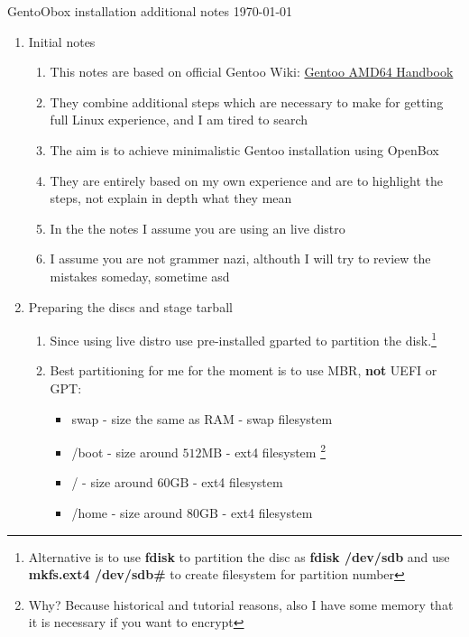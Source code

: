 \documentclass[10pt,a4paper]{article}
\begin{document}
	\pagestyle{fancy}
	\begin{center} GentoObox installation additional notes \today \end{center}

	\begin{enumerate}
		
		\item Initial notes \begin{enumerate}[label*=\arabic*.]

			\item This notes are based on official Gentoo Wiki: \href{https://wiki.gentoo.org/wiki/Handbook:AMD64}{Gentoo AMD64 Handbook} \\ 
			\item They combine additional steps which are necessary to make for getting full Linux experience, and I am tired to search
			\item The aim is to achieve minimalistic Gentoo installation using OpenBox
			\item They are entirely based on my own experience and are to highlight the steps, not explain in depth what they mean 
			\item In the the notes I assume you are using an live distro
			\item I assume you are not grammer nazi, althouth I will try to review the mistakes someday, sometime asd 

		\end{enumerate}
		
		\newpage
		
		\item Preparing the discs and stage tarball \begin{enumerate}[label*=\arabic*.]
			
			\item Since using live distro use pre-installed gparted to partition the disk.\footnote{ Alternative is to use \textbf{fdisk} to partition the disc as \textbf{fdisk /dev/sdb} and use \textbf{mkfs.ext4 /dev/sdb\#} to create filesystem for partition number }
			
			\item Best partitioning for me for the moment is to use MBR, \textbf{not} UEFI or GPT:\begin{itemize}
				\item swap - size the same as RAM - swap filesystem 
				\item /boot - size around $ 512\mbox{MB} $  - ext4 filesystem \footnote{Why? Because historical and tutorial reasons, also I have some memory that it is necessary if you want to encrypt }
				\item / - size around $ 60\mbox{GB} $ - ext4 filesystem
				\item /home - size around $ 80\mbox{GB} $ - ext4 filesystem
			\end{itemize}
			

\end{enumerate}
\end{enumerate}
\end{document}
